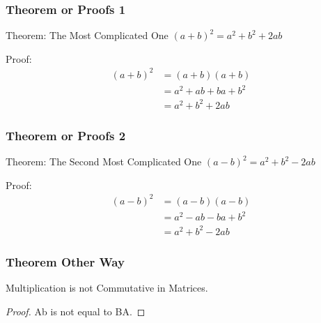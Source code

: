 \documentclass{beamer}
\begin{document}
\begin{frame}
\frametitle{Theorem or Proofs 1}

\begin{block}{Theorem: The Most Complicated One}
        $(a+b)^2 = a^2 + b^2 + 2ab$
\end{block}

\begin{exampleblock}{Proof:}
\begin{equation*}
       \begin{split}
           (a+b)^2 & = (a+b)(a+b) \\
           & = a^2 + ab + ba + b^2 \\
           & = a^2 + b^2 + 2ab
       \end{split}
\end{equation*}
\end{exampleblock}

\end{frame}

\begin{frame}
\frametitle{Theorem or Proofs 2}

\begin{block}{Theorem: The Second Most Complicated One}
        $(a-b)^2 = a^2 + b^2 - 2ab$
\end{block}

\begin{exampleblock}{Proof:}
\begin{equation*}
       \begin{split}
           (a-b)^2 & = (a-b)(a-b) \\
           & = a^2 - ab - ba + b^2 \\
           & = a^2 + b^2 - 2ab
       \end{split}
\end{equation*}
\end{exampleblock}
    
\end{frame}

\begin{frame}
\frametitle{Theorem Other Way}

\begin{theorem}
    Multiplication is not Commutative in Matrices.
\end{theorem}

\begin{proof}
    Ab is not equal to BA.
\end{proof}

\end{frame}
\end{document}
